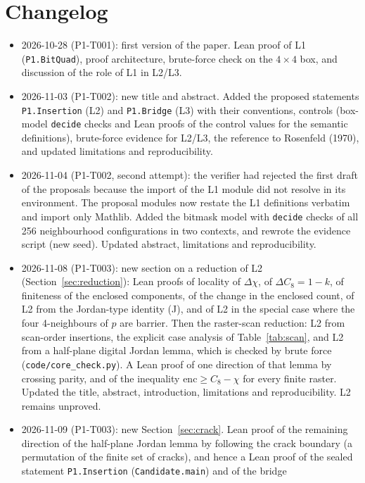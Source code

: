 \documentclass[11pt]{article}
\theoremstyle{definition}
\theoremstyle{remark}
\begin{document}
\section*{Changelog}
\begin{itemize}
\item 2026-10-28 (P1-T001): first version of the paper. Lean proof of L1
  (\texttt{P1.BitQuad}), proof architecture, brute-force check on the
  $4\times4$ box, and discussion of the role of L1 in L2/L3.
\item 2026-11-03 (P1-T002): new title and abstract. Added the proposed
  statements \texttt{P1.Insertion} (L2) and \texttt{P1.Bridge} (L3) with their
  conventions, controls (box-model \texttt{decide} checks and Lean proofs of the
  control values for the semantic definitions), brute-force evidence for L2/L3,
  the reference to Rosenfeld (1970), and updated limitations and reproducibility.
\item 2026-11-04 (P1-T002, second attempt): the verifier had rejected the first
  draft of the proposals because the import of the L1 module did not resolve in its
  environment. The proposal modules now restate the L1 definitions verbatim and
  import only Mathlib. Added the bitmask model with \texttt{decide} checks of all
  256 neighbourhood configurations in two contexts, and rewrote the evidence
  script (new seed). Updated abstract, limitations and reproducibility.
\item 2026-11-08 (P1-T003): new section on a reduction of L2
  (Section~\ref{sec:reduction}): Lean proofs of locality of $\Delta\chi$,
  of $\Delta C_8 = 1-k$, of finiteness of the enclosed components, of the change
  in the enclosed count, of L2 from the Jordan-type identity (J), and of L2 in
  the special case where the four 4-neighbours of $p$ are barrier. Then the
  raster-scan reduction: L2 from scan-order insertions, the explicit case analysis
  of Table~\ref{tab:scan}, and L2 from a half-plane digital Jordan lemma, which is
  checked by brute force (\texttt{code/core\_check.py}). A Lean proof of one
  direction of that lemma by crossing parity, and of the inequality
  $\mathrm{enc}\ge C_8-\chi$ for every finite raster. Updated the title, abstract, introduction,
  limitations and reproducibility. L2 remains unproved.
\item 2026-11-09 (P1-T003): new Section~\ref{sec:crack}. Lean proof of the remaining
  direction of the half-plane Jordan lemma by following the crack boundary
  (a permutation of the finite set of cracks), and hence a Lean proof of the sealed
  statement \texttt{P1.Insertion} (\texttt{Candidate.main}) and of the bridge

\end{itemize}
\end{document}
